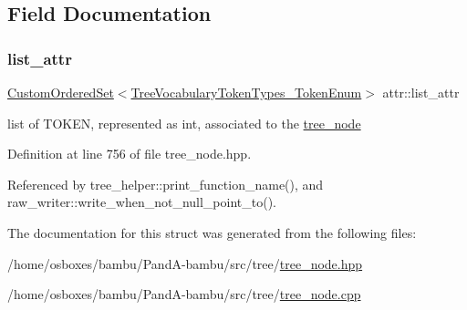 \subsection{Field Documentation}
\mbox{\label{structattr_a87486073f129ef3c46e9f9711b5d0559}} 
\subsubsection{\texorpdfstring{list\+\_\+attr}{list\_attr}}
{\footnotesize\ttfamily \hyperlink{classCustomOrderedSet}{Custom\+Ordered\+Set}$<$\hyperlink{token__interface_8hpp_a14502d0757789149f644966ca931b126}{Tree\+Vocabulary\+Token\+Types\+\_\+\+Token\+Enum}$>$ attr\+::list\+\_\+attr}



list of T\+O\+K\+EN, represented as int, associated to the \hyperlink{classtree__node}{tree\+\_\+node} 



Definition at line 756 of file tree\+\_\+node.\+hpp.



Referenced by tree\+\_\+helper\+::print\+\_\+function\+\_\+name(), and raw\+\_\+writer\+::write\+\_\+when\+\_\+not\+\_\+null\+\_\+point\+\_\+to().



The documentation for this struct was generated from the following files\+:\begin{DoxyCompactItemize}
\item 
/home/osboxes/bambu/\+Pand\+A-\/bambu/src/tree/\hyperlink{tree__node_8hpp}{tree\+\_\+node.\+hpp}\item 
/home/osboxes/bambu/\+Pand\+A-\/bambu/src/tree/\hyperlink{tree__node_8cpp}{tree\+\_\+node.\+cpp}\end{DoxyCompactItemize}
